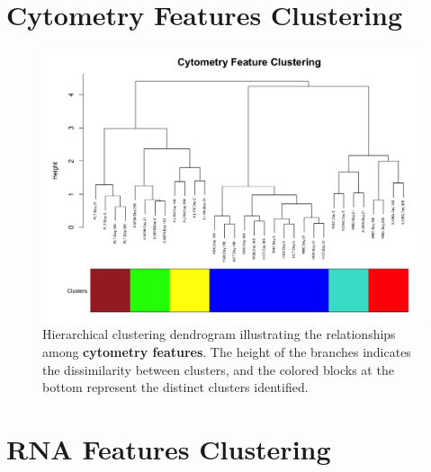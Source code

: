 \documentclass[12pt,a4paper]{report}
\begin{document}
\section{Cytometry Features Clustering}
\label{appendix:cytometry_features_clusterings}
\begin{figure}[H]
    \centering
    \includegraphics[width=\linewidth]{images/Cytometry_features_clustering_cut_colors.png}
    \caption[Cytometry features clustering dendrogram]{Hierarchical clustering dendrogram illustrating the relationships among \textbf{cytometry features}. The height of the branches indicates the dissimilarity between clusters, and the colored blocks at the bottom represent the distinct clusters identified.}
    \label{fig:Cytometry_features_clustering_cut_colors}
\end{figure}

\section{RNA Features Clustering}
\label{appendix:rna_features_clusterings}
\end{document}
